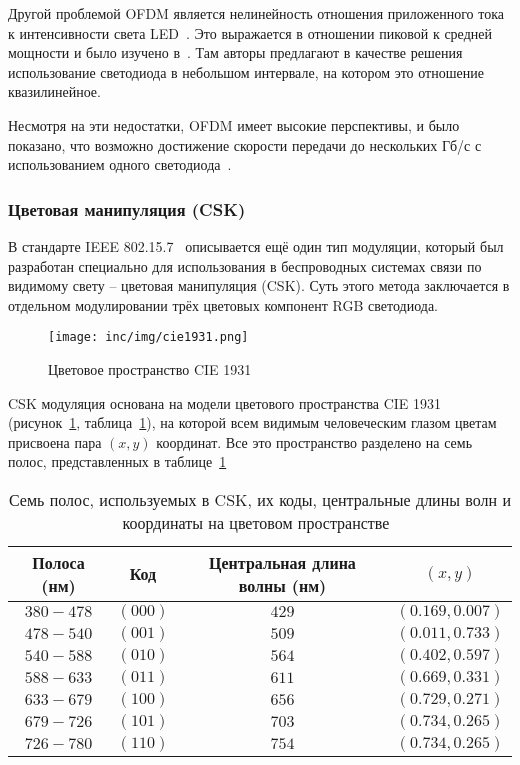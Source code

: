 Другой проблемой OFDM является нелинейность отношения приложенного тока к интенсивности света LED~\cite{Burchardt2014}. Это выражается в отношении пиковой к средней мощности и было изучено в~\cite{Elgala2009,Elgala2009}. Там авторы предлагают в качестве решения использование светодиода в небольшом интервале, на котором это отношение квазилинейное. 

Несмотря на эти недостатки, OFDM  имеет высокие перспективы, и было показано, что возможно достижение скорости передачи до нескольких Гб/с с использованием одного светодиода~\cite{Khalid2012,Tsonev2014}.

\subsubsection{Цветовая манипуляция (CSK)}

В стандарте IEEE 802.15.7~\cite{IEEE2018} описывается ещё один тип модуляции, который был разработан специально для использования в беспроводных системах связи по видимому свету \--- цветовая манипуляция (CSK). Суть этого метода заключается в отдельном модулировании трёх цветовых компонент RGB светодиода. 

\begin{figure}[!ht]
    \centering
    \texttt{[image: inc/img/cie1931.png]}
    \caption{Цветовое пространство CIE 1931~\cite{IEEE2018}}
    \label{fig:cie1931}
\end{figure}

CSK модуляция основана на модели цветового пространства CIE 1931~\cite{CIE1931} (рисунок~\ref{fig:cie1931}, таблица~\ref{table:cie1931}), на которой всем видимым человеческим глазом цветам присвоена пара $(x,y)$ координат. Все это пространство разделено на семь полос, представленных в таблице~\ref{table:cie1931}

\begin{table}[!h]
    \centering
    \begin{tabular}{|c| c| c| c|} 
     \hline
     Полоса (нм) & Код & Центральная длина волны (нм) & $(x,y)$ \\ \hline
     $380-478$ & $(000)$ & $429$ & $(0.169, 0.007)$ \\ \hline
     $478-540$ & $(001)$ & $509$ & $(0.011, 0.733)$ \\ \hline
     $540-588$ & $(010)$ & $564$ & $(0.402, 0.597)$ \\ \hline
     $588-633$ & $(011)$ & $611$ & $(0.669, 0.331)$ \\ \hline
     $633-679$ & $(100)$ & $656$ & $(0.729, 0.271)$ \\ \hline
     $679-726$ & $(101)$ & $703$ & $(0.734, 0.265)$ \\ \hline
     $726-780$ & $(110)$ & $754$ & $(0.734, 0.265)$ \\ \hline
    \end{tabular}
    \caption{Семь полос, используемых в CSK, их коды, центральные длины волн и координаты на цветовом пространстве~\cite{IEEE2018}}
    \label{table:cie1931}
\end{table}

